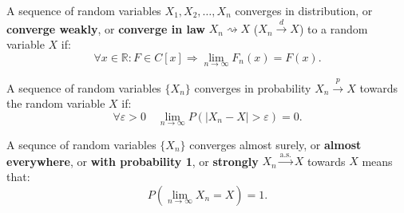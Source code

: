\begin{definition}
    A sequence of random variables $X_1, X_2, \ldots, X_n$ converges
    in distribution, or \textbf{converge weakly}, or \textbf{converge in law}
    $X_n \rightsquigarrow X$ ($X_n \overset{d}{\to} X$)
    to a random variable $X$ if:
    \[
        \forall x \in \mathbb{R}: F \in C[x] \Rightarrow
        \underset{n \to \infty}{\lim} F_n(x) = F(x)
    .\] 
\end{definition}


\begin{definition}
    A sequence of random variables $\{X_n\}$ converges in probability 
    $X_n \overset{p}{\to} X$
    towards the random variable  $X$ if:
     \[
    \forall \varepsilon > 0 \quad
\underset{n \to \infty}{\lim} P\left( \left| X_n - X \right| > \varepsilon \right) = 0
    .\] 
    
\end{definition}

\begin{definition}
    A sequnce of random variables $\{X_n\}$ converges almost surely,
    or \textbf{almost everywhere}, or \textbf{with probability 1}, or
    \textbf{strongly}
    $X_n \overset{\text{a.s.}}{\to} X$
    towards  $X$ means that:
    \[
    P\left( \lim_{n \to \infty} X_n = X \right) = 1
    .\] 
    
\end{definition}

